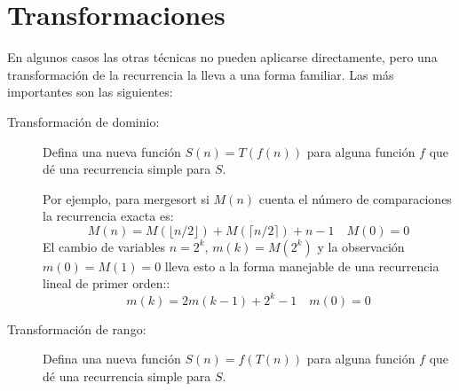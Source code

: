 \section{Transformaciones}
\label{sec:transformaciones}

  En algunos casos las otras técnicas no pueden aplicarse directamente,
  pero una transformación de la recurrencia la lleva a una forma familiar.
  Las más importantes son las siguientes:
  \begin{description}
  \item[Transformación de dominio:]
    Defina una nueva función \(S(n) = T(f(n))\) para alguna función \(f\)
    que dé una recurrencia simple para \(S\).

    Por ejemplo,
    para mergesort si \(M(n)\) cuenta el número de comparaciones
    la recurrencia exacta es:
    \begin{equation*}
      M(n)
        = M(\lfloor n / 2 \rfloor) + M(\lceil n / 2 \rceil) + n - 1
        \quad M(0) = 0
    \end{equation*}
    El cambio de variables \(n = 2^k\), \(m(k) = M(2^k)\)
    y la observación \(m(0) = M(1) = 0\)
    lleva esto a la forma manejable
    de una recurrencia lineal de primer orden::
    \begin{equation*}
      m(k)
        = 2 m(k - 1) + 2^k - 1
        \quad m(0) = 0
    \end{equation*}
  \item[Transformación de rango:]
    Defina una nueva función \(S(n) = f(T(n))\) para alguna función \(f\)
    que dé una recurrencia simple para \(S\).


\end{description}
